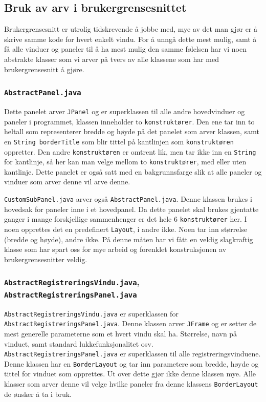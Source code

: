 \subsection{Bruk av arv i brukergrensesnittet}
Brukergrensesnitt er utrolig tidskrevende å jobbe med, mye av det man gjør er å skrive samme kode for hvert enkelt vindu.
For å unngå dette mest mulig, samt å få alle vinduer og paneler til å ha mest mulig den samme følelsen har vi noen abstrakte klasser som vi arver på tvers av alle klassene som har med brukergrensesnitt å gjøre.


\subsubsection*{\texttt{AbstractPanel.java}}
Dette panelet arver \texttt{JPanel} og er superklassen til alle andre hovedvinduer og paneler i programmet, klassen inneholder to \texttt{konstruktører}. Den ene tar inn to heltall som representerer bredde og høyde på det panelet som arver klassen, samt en \texttt{String borderTitle} som blir tittel på kantlinjen som \texttt{konstruktøren} oppretter.
Den andre \texttt{konstruktøren} er omtrent lik, men tar ikke inn en \texttt{String} for kantlinje, så her kan man velge mellom to \texttt{konstruktører}, med eller uten kantlinje.
Dette panelet er også satt med en bakgrunnsfarge slik at alle paneler og vinduer som arver denne vil arve denne.

\texttt{CustomSubPanel.java} arver også \texttt{AbstractPanel.java}. Denne klassen brukes i hovedsak for paneler inne i et hovedpanel. Da dette panelet skal brukes gjentatte ganger i mange forskjellige sammenhenger er det hele 6 \texttt{konstruktører} her. 
I noen opprettes det en predefinert \texttt{Layout}, i andre ikke. Noen tar inn størrelse (bredde og høyde), andre ikke. På denne måten har vi fått en veldig slagkraftig klasse som har spart oss for mye arbeid og forenklet konstruksjonen av brukergrensesnitter veldig.


\subsubsection*{\texttt{AbstractRegistreringsVindu.java}, \texttt{AbstractRegistreringsPanel.java}}
\texttt{AbstractRegistreringsVindu.java} er superklassen for \texttt{AbstractRegistreringsPanel.java}. Denne klassen arver \texttt{JFrame} og er setter de mest generelle parameterne som et hvert vindu skal ha. Størrelse, navn på vinduet, samt standard lukkefunksjonalitet osv.
\texttt{AbstractRegistreringsPanel.java} er superklassen til alle registreringsvinduene. Denne klassen har en \texttt{BorderLayout} og tar inn parametere som bredde, høyde og tittel for vinduet som opprettes. Ut over dette gjør ikke denne klassen mye. Alle klasser som arver denne vil velge hvilke paneler fra denne klassens \texttt{BorderLayout} de ønsker å ta i bruk.


